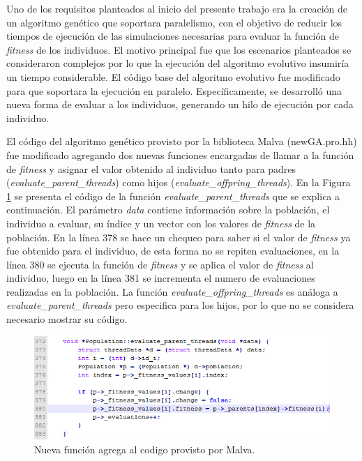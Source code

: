 Uno de los requisitos planteados al inicio del presente trabajo era la creación de un algoritmo genético que soportara paralelismo, con el objetivo de reducir los tiempos de ejecución de las simulaciones necesarias para evaluar la función de \emph{fitness} de los individuos. El motivo principal fue que los escenarios planteados se consideraron complejos por lo que la ejecución del algoritmo evolutivo insumiría un tiempo considerable. El código base del algoritmo evolutivo fue modificado para que soportara la ejecución en paralelo. Específicamente, se desarrolló una nueva forma de evaluar a los individuos, generando un hilo de ejecución por cada individuo.

El código del algoritmo genético provisto por la biblioteca Malva (newGA.pro.hh) fue modificado agregando dos nuevas funciones encargadas de llamar a la función de \emph{fitness} y asignar el valor obtenido al individuo tanto para padres (\emph{evaluate{\_}parent{\_}threads}) como hijos (\emph{evaluate{\_}offpring{\_}threads}). En la Figura \ref{fig:codigo1} se presenta el código de la función \emph{evaluate{\_}parent{\_}threads} que se explica a continuación. El parámetro \emph{data} contiene información sobre la población, el individuo a evaluar, su índice y un vector con los valores de \emph{fitness} de la población.
En la línea 378 se hace un chequeo para saber si el valor de \emph{fitness} ya fue obtenido para el individuo, de esta forma no se repiten evaluaciones, en la línea 380 se ejecuta la función de \emph{fitness} y se aplica el valor de \emph{fitness} al individuo, luego en la línea 381 se incrementa el numero de evaluaciones realizadas en la población.
La función \emph{evaluate{\_}offpring{\_}threads} es análoga a \emph{evaluate{\_}parent{\_}threads} pero especifica para los hijos, por lo que no se considera necesario mostrar su código.



\begin{figure}[H]
	\centering
	\includegraphics[width=0.99\linewidth]{Figures/codigo1}
	\caption{Nueva función agrega al codigo provisto por Malva.}
	\label{fig:codigo1}
\end{figure}

